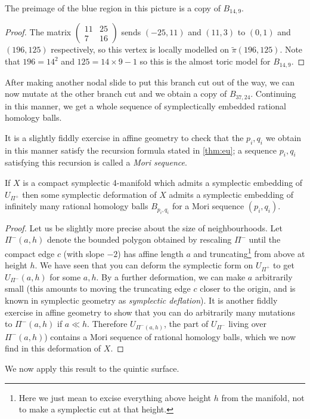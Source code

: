 \documentclass{article}
\begin{document}
\begin{Lemma}
The preimage of the blue region in this picture is a copy of
\(B_{14,9}\).
\end{Lemma}
\begin{proof}
The matrix \(\begin{pmatrix}11 & 25 \\ 7 & 16\end{pmatrix}\) sends
\((-25,11)\) and \((11,3)\) to \((0,1)\) and \((196,125)\)
respectively, so this vertex is locally modelled on
\(\tilde{\pi}(196,125)\). Note that \(196=14^2\) and \(125=14\times
9-1\) so this is the almost toric model for \(B_{14,9}\). \qedhere


\end{proof}
After making another nodal slide to put this branch cut out of the
way, we can now mutate at the other branch cut and we obtain a copy of
\(B_{37,24}\). Continuing in this manner, we get a whole sequence of
symplectically embedded rational homology balls.


\begin{Remark}
It is a slightly fiddly exercise in affine geometry to check that
the \(p_i,q_i\) we obtain in this manner satisfy the recursion
formula stated in \cref{thm:eu}; a sequence \(p_i,q_i\) satisfying
this recursion is called a {\em Mori sequence}.


\end{Remark}
\begin{Lemma}\label{cor:mori}
If \(X\) is a compact symplectic 4-manifold which admits a
symplectic embedding of \(U_{\Pi^+}\) then some symplectic
deformation of \(X\) admits a symplectic embedding of infinitely
many rational homology balls \(B_{p_i,q_i}\) for a Mori sequence
\((p_i,q_i)\).
\end{Lemma}
\begin{proof}
Let us be slightly more precise about the size of
neighbourhoods. Let \(\Pi^-(a,h)\) denote the bounded polygon
obtained by rescaling \(\Pi^-\) until the compact edge \(c\) (with
slope \(-2\)) has affine length \(a\) and truncating\footnote{Here
we just mean to excise everything above height \(h\) from the
manifold, not to make a symplectic cut at that height.} from above
at height \(h\). We have seen that you can deform the symplectic
form on \(U_{\Pi^+}\) to get \(U_{\Pi^-}(a,h)\) for some \(a,h\). By
a further deformation, we can make \(a\) arbitrarily small (this
amounts to moving the truncating edge \(c\) closer to the origin,
and is known in symplectic geometry as {\em symplectic
deflation}). It is another fiddly exercise in affine geometry
{\cite[Lemma 3.13]{EU}} to show that you can do arbitrarily many
mutations to \(\Pi^-(a,h)\) if \(a\ll h\). Therefore
\(U_{\Pi^-(a,h)}\), the part of \(U_{\Pi^-}\) living over
\(\Pi^-(a,h)\)) contains a Mori sequence of rational homology balls,
which we now find in this deformation of \(X\). \qedhere


\end{proof}
We now apply this result to the quintic surface.
\end{document}
